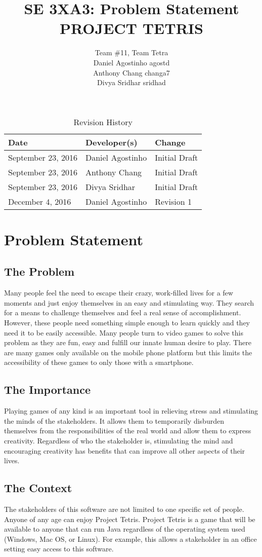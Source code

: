 \documentclass{article}
\title{SE 3XA3: Problem Statement\\PROJECT TETRIS}
\author{Team \#11, Team Tetra
		\\ Daniel Agostinho agostd
		\\ Anthony Chang changa7
		\\ Divya Sridhar sridhad
}
\date{}
\begin{document}
\begin{table}[hp]
\caption{Revision History} \label{TblRevisionHistory}
\begin{tabularx}{\textwidth}{llX}
\toprule
\textbf{Date} & \textbf{Developer(s)} & \textbf{Change}\\
\midrule
September 23, 2016 & Daniel Agostinho & Initial Draft\\
September 23, 2016 & Anthony Chang & Initial Draft\\
September 23, 2016 & Divya Sridhar & Initial Draft\\
December 4, 2016 & Daniel Agostinho & Revision 1\\
\bottomrule
\end{tabularx}
\end{table}

\newpage

\maketitle

\section{Problem Statement}

\subsection{The Problem}
Many people feel the need to escape their crazy, work-filled lives for a few moments and just enjoy themselves in an easy and stimulating way. They search for a means to challenge themselves and feel a real sense of accomplishment. However, these people need something simple enough to learn quickly and they need it to be easily accessible. Many people turn to video games to solve this problem as they are fun, easy and fulfill our innate human desire to play. There are many games only available on the mobile phone platform but this limits the accessibility of these games to only those with a smartphone.
\subsection{The Importance}
Playing games of any kind is an important tool in relieving stress and stimulating the minds of the stakeholders. It allows them to temporarily disburden themselves from the responsibilities of the real world and allow them to express creativity. Regardless of who the stakeholder is, stimulating the mind and encouraging creativity has benefits that can improve all other aspects of their lives.
\subsection{The Context}
The stakeholders of this software are not limited to one specific set of people. Anyone of any age can enjoy Project Tetris. Project Tetris is a game that will be available to anyone that can run Java regardless of the operating system used (Windows, Mac OS, or Linux). For example, this allows a stakeholder in an office setting easy access to this software.
\end{document}
